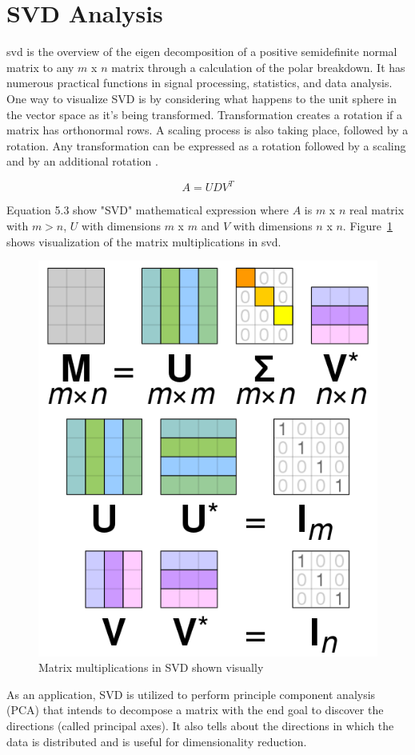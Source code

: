 \section{SVD Analysis}

\gls{svd} is the overview of the eigen decomposition of a positive semidefinite normal matrix to any $m$ x $n$ matrix through a calculation of the polar breakdown. It has numerous practical functions in signal processing, statistics, and data analysis.
One way to visualize SVD is by considering what happens to the unit sphere in the vector space as it’s being transformed. Transformation creates a rotation if a matrix has orthonormal rows. A scaling process is also taking place, followed by a rotation. Any transformation can be expressed as a rotation followed by a scaling and by an additional rotation \cite{SVD}.

\begin{equation} \label{eq:svd_formula}
 A = UDV^{T}
\end{equation}

Equation 5.3 show "SVD" mathematical expression where $A$ is $m$ x $n$ real matrix with $m>n$, $U$ with dimensions $m$ x $m$ and $V$ with dimensions $n$ x $n$. Figure~\ref{fig:svd_matrix} shows visualization of the matrix multiplications in \gls{svd}.

    \begin{figure}[H]
            \centering
            \includegraphics[width=0.5\linewidth]{figures/ch5/svd_matrix.png}
            \caption{\label{fig:svd_matrix} Matrix multiplications in SVD shown visually \cite{SVD}}
    \end{figure}

As an application, SVD is utilized to perform principle component analysis (PCA) that intends to decompose a matrix with the end goal to discover the directions (called principal axes). It also tells about the directions in which the data is distributed and is useful for dimensionality reduction. 

